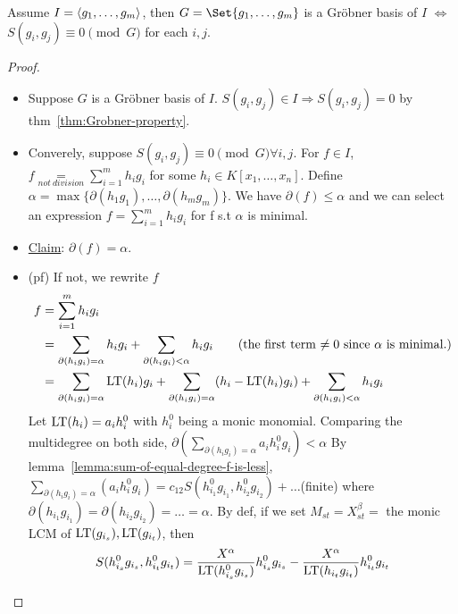 \begin{theorem}
  Assume $I = \langle g_1, \dots, g_m \rangle$, then
  $G = \Set{g_1, \dots, g_m}$ is a Gr\"{o}bner basis of $I$ $\iff$
  $S(g_i, g_j) \equiv 0 \pmod{G}$ for each $i, j$.
  \begin{proof} \mbox{}
    \begin{itemize}
      \item Suppose $G$ is a Gr\"{o}bner basis of $I$.
        $S(g_i, g_j) \in I \Rightarrow S(g_i, g_j) = 0$
        by thm~\ref{thm:Grobner-property}.
      \item Converely, suppose $S(g_i, g_j) \equiv 0 \pmod G \forall i, j$.
        For $f \in I$, $f \underset{not\ division}{=}
        \sum\limits_{i=1}^m h_ig_i$ for some $h_i \in K[x_1,\dots,x_n]$.
        Define $\alpha = \max\{\partial(h_1g_1),\dots,\partial(h_mg_m)\}$.
        We have $\partial(f) \leq \alpha$ and we can select an expression
        $f = \sum\limits_{i=1}^m h_ig_i$ for f s.t $\alpha$ is minimal.
      \item \uline{Claim}: $\partial(f) = \alpha$.
      \item (pf) If not, we rewrite $f$
        \[
          \begin{split}
            f &= \sum_{i = 1}^m h_ig_i \\
            &= \sum_{\partial(h_ig_i) = \alpha} h_ig_i
              + \sum_{\partial(h_ig_i) < \alpha} h_ig_i
              \qquad (\text{the first term $\neq 0$ since $\alpha$ is minimal.}) \\
            &= \sum_{\partial(h_ig_i) = \alpha} \operatorname{LT}(h_i)g_i
              + \sum_{\partial(h_ig_i) = \alpha} (h_i-\operatorname{LT}(h_i)g_i)
              + \sum_{\partial(h_ig_i) < \alpha} h_ig_i
          \end{split}
        \]
        Let $\operatorname{LT}(h_i) = a_ih_i^0$ with $h_i^0$ being a monic monomial.
        Comparing the multidegree on both side,
        $\partial\left(\sum\limits_{\partial(h_ig_i) = \alpha} a_ih_i^0g_i\right)
        < \alpha$ By lemma~\ref{lemma:sum-of-equal-degree-f-is-less},
        $\underset{\partial(h_ig_i) = \alpha}{\sum}\left(a_ih_i^0g_i\right) =
        c_{12}S(h_{i_1}^0g_{i_1},h_{i_2}^0g_{i_2}) + \dots$(finite) where
        $\partial(h_{i_1}g_{i_1}) = \partial(h_{i_2}g_{i_2}) = \dots = \alpha$.
        By def, if we set $M_{st} = X^\beta_{st} =$ the monic LCM of
        $\operatorname{LT}(g_{i_s}), \operatorname{LT}(g_{i_t})$, then
        \[
          \begin{split}
            S(h_{i_s}^0g_{i_s}, h_{i_t}^0g_{i_t}) &= \frac{X^\alpha}{\LT(h_{i_s}^0g_{i_s})}h_{i_s}^0g_{i_s} - \frac{X^\alpha}{\LT(h_{i_t}g_{i_t})}h_{i_t}^0g_{i_t} \\

\end{split}\]
\end{itemize}
\end{proof}
\end{theorem}
